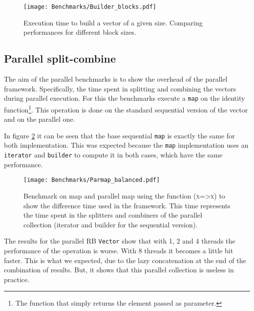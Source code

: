 \begin{figure}[h!]
  \centering
  \texttt{[image: Benchmarks/Builder\_blocks.pdf]}
  \caption{Execution time to build a vector of a given size. Comparing performances for different block sizes.}
  \label{BuilderBlocksBenchmarks}
\end{figure}

\FloatBarrier

\subsection{Parallel split-combine}
The aim of the parallel benchmarks is to show the overhead of the parallel framework. Specifically, the time spent in splitting and combining the vectors during parallel execution. For this the benchmarks execute a \texttt{map} on the identity function\footnote{The function that simply returns the element passed as parameter.}. This operation is done on the standard sequential version of the vector and on the parallel one.

In figure \ref{ParallelBenchmarks} it can be seen that the base sequential \texttt{map} is exactly the same for both implementation. This was expected because the \texttt{map} implementation uses an \texttt{iterator} and \texttt{builder} to compute it in both cases, which have the same performance. 

\begin{figure}[h!]
  \centering
  \texttt{[image: Benchmarks/Parmap\_balanced.pdf]}
  \caption{Benchmark on map and parallel map using the function (\textsc{x=>x}) to show the difference time used in the framework. This time represents the time spent in the splitters and combiners of the parallel collection (iterator and builder for the sequential version).}
  \label{ParallelBenchmarks}
\end{figure}

The results for the parallel RB \texttt{Vector} show that with 1, 2 and 4 threads the performance of the operation is worse. With 8 threads it becomes a little bit faster. This is what we expected, due to the lazy concatenation at the end of the combination of results. But, it shows that this parallel collection is useless in practice.

